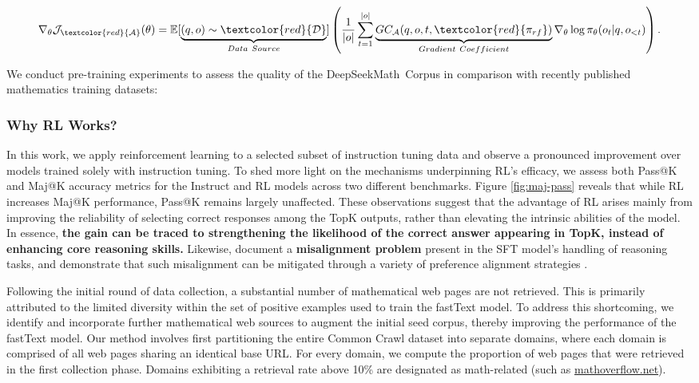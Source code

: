 \begin{itemize}[topsep=0pt]
\begin{itemize}[topsep=0pt]
\begin{equation}
    \nabla_{\theta}\mathcal{J}_{\textcolor{red}{\mathcal{A}}}(\theta) = \mathbb{E}[\underbrace{(q,o) \sim \textcolor{red}{\mathcal{D}}}_{Data \ Source}]\left( \frac{1}{|o|} \sum_{t=1}^{|o|}  \underbrace{GC_{{\mathcal{A}}}(q, o, t, \textcolor{red}{\pi_{{rf}}})}_{Gradient \ Coefficient}  \nabla_{\theta}\log \pi_{\theta}(o_t | q, o_{<t})\right).
\label{eq:objective}
\end{equation}

We conduct pre-training experiments to assess the quality of the DeepSeekMath~Corpus in comparison with recently published mathematics training datasets:

\subsubsection{Why RL Works?} In this work, we apply reinforcement learning to a selected subset of instruction tuning data and observe a pronounced improvement over models trained solely with instruction tuning. To shed more light on the mechanisms underpinning RL’s efficacy, we assess both Pass@K and Maj@K accuracy metrics for the Instruct and RL models across two different benchmarks. Figure \ref{fig:maj-pass} reveals that while RL increases Maj@K performance, Pass@K remains largely unaffected. These observations suggest that the advantage of RL arises mainly from improving the reliability of selecting correct responses among the TopK outputs, rather than elevating the intrinsic abilities of the model. In essence, \textbf{the gain can be traced to strengthening the likelihood of the correct answer appearing in TopK, instead of enhancing core reasoning skills.} Likewise, \citep{wang2023making} document a \textbf{misalignment problem} present in the SFT model’s handling of reasoning tasks, and demonstrate that such misalignment can be mitigated through a variety of preference alignment strategies \citep{yuan2023rrhf,song2023preference,wang2023making}.

Following the initial round of data collection, a substantial number of mathematical web pages are not retrieved. This is primarily attributed to the limited diversity within the set of positive examples used to train the fastText model. To address this shortcoming, we identify and incorporate further mathematical web sources to augment the initial seed corpus, thereby improving the performance of the fastText model. Our method involves first partitioning the entire Common Crawl dataset into separate domains, where each domain is comprised of all web pages sharing an identical base URL. For every domain, we compute the proportion of web pages that were retrieved in the first collection phase. Domains exhibiting a retrieval rate above 10\% are designated as math-related (such as \url{mathoverflow.net}). 


\end{itemize}
\end{itemize}
